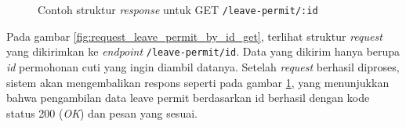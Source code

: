 \begin{figure}
    \centering
    \caption{Contoh struktur \textit{response} untuk GET \texttt{/leave-permit/{:id}}}
    \label{fig:response_leave_permit_by_id_get}
\end{figure}

Pada gambar \ref{fig:request_leave_permit_by_id_get}, terlihat struktur \textit{request} yang dikirimkan ke \textit{endpoint} \texttt{/leave-permit/{id}}. Data yang dikirim hanya berupa \textit{id} permohonan cuti yang ingin diambil datanya. Setelah \textit{request} berhasil diproses, sistem akan mengembalikan respons seperti pada gambar \ref{fig:response_leave_permit_by_id_get}, yang menunjukkan bahwa pengambilan data leave permit berdasarkan id berhasil dengan kode status 200 (\textit{OK}) dan pesan yang sesuai.


